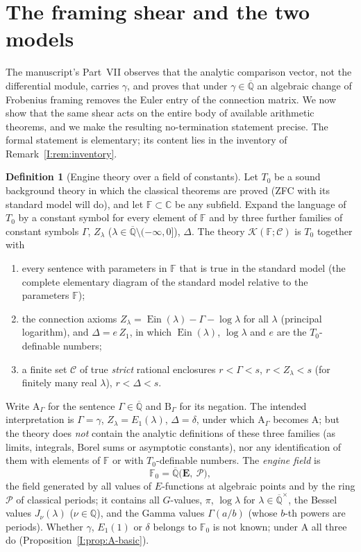 \documentclass[11pt,a4paper]{article}
\newcommand{\Q}{\mathbb Q}
\newcommand{\C}{\mathbb C}
\newcommand{\Qbar}{\overline{\mathbb Q}}
\newcommand{\Ein}{\operatorname{Ein}}
\newcommand{\EE}{\mathbf E}
\newcommand{\Fld}{\mathbb F}
\newcommand{\Th}{\mathcal K}
\theoremstyle{definition}
\newtheorem{definition}[theorem]{Definition}
\theoremstyle{remark}
\numberwithin{equation}{section}
\begin{document}
\section{The framing shear and the two models}\label{I:sec:shear}

The manuscript's Part~VII observes that the analytic comparison vector, not the
differential module, carries $\gamma$, and \cite{K002} proves that under
$\gamma\in\Qbar$ an algebraic change of Frobenius framing removes the Euler entry of the
connection matrix. We now show that the same shear acts on the entire body of available
arithmetic theorems, and we make the resulting no-termination statement precise. The
formal statement is elementary; its content lies in the inventory of
Remark~\ref{I:rem:inventory}.

\begin{definition}[Engine theory over a field of constants]\label{I:def:K}
Let $T_0$ be a sound background theory in which the classical theorems are proved (ZFC
with its standard model will do), and let $\Fld\subset\C$ be any subfield. Expand the
language of $T_0$ by a constant symbol for every element of $\Fld$ and by three further
families of constant symbols $\Gamma$, $Z_\lambda$ ($\lambda\in\Qbar\setminus(-\infty,0]$),
$\Delta$. The theory $\Th(\Fld;\mathcal C)$ is $T_0$ together with
\begin{enumerate}[label=(K\arabic*)]
\item every sentence with parameters in $\Fld$ that is true in the standard model (the
complete elementary diagram of the standard model relative to the parameters $\Fld$);
\item the connection axioms $Z_\lambda=\Ein(\lambda)-\Gamma-\log\lambda$ for all
$\lambda$ (principal logarithm), and $\Delta=e\,Z_1$, in which $\Ein(\lambda)$,
$\log\lambda$ and $e$ are the $T_0$-definable numbers;
\item a finite set $\mathcal C$ of true \emph{strict} rational enclosures $r<\Gamma<s$,
$r<Z_\lambda<s$ (for finitely many real $\lambda$), $r<\Delta<s$.
\end{enumerate}
Write $\mathrm A_\Gamma$ for the sentence $\Gamma\in\Qbar$ and $\mathrm B_\Gamma$ for its
negation. The intended interpretation is $\Gamma=\gamma$, $Z_\lambda=E_1(\lambda)$,
$\Delta=\delta$, under which $\mathrm A_\Gamma$ becomes $\mathrm A$; but the theory does
\emph{not} contain the analytic definitions of these three families (as limits, integrals,
Borel sums or asymptotic constants), nor any identification of them with elements of
$\Fld$ or with $T_0$-definable numbers. The \emph{engine field} is
\[
 \Fld_0=\Qbar\bigl(\EE,\ \mathcal P\bigr),
\]
the field generated by all values of $E$-functions at algebraic points and by the ring
$\mathcal P$ of classical periods; it contains all $G$-values, $\pi$, $\log\lambda$ for
$\lambda\in\Qbar^\times$, the Bessel values $J_\nu(\lambda)$ ($\nu\in\Q$), and the Gamma
values $\Gamma(a/b)$ (whose $b$-th powers are periods). Whether $\gamma$, $E_1(1)$ or
$\delta$ belongs to $\Fld_0$ is not known; under $\mathrm A$ all three do
(Proposition~\ref{I:prop:A-basic}).
\end{definition}
\end{document}
